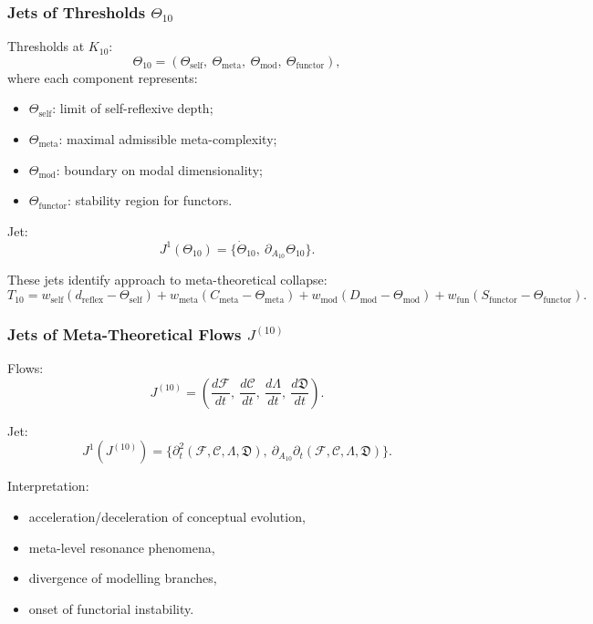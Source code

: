 \subsubsection{Jets of Thresholds $\Theta_{10}$}

Thresholds at $K_{10}$:
\[
\Theta_{10}
=
(\Theta_{\mathrm{self}},\ 
 \Theta_{\mathrm{meta}},\ 
 \Theta_{\mathrm{mod}},\ 
 \Theta_{\mathrm{functor}}),
\]
where each component represents:
\begin{itemize}
    \item $\Theta_{\mathrm{self}}$: limit of self-reflexive depth;
    \item $\Theta_{\mathrm{meta}}$: maximal admissible meta-complexity;
    \item $\Theta_{\mathrm{mod}}$: boundary on modal dimensionality;
    \item $\Theta_{\mathrm{functor}}$: stability region for functors.
\end{itemize}

Jet:
\[
J^1(\Theta_{10})
=
\{\dot{\Theta}_{10},\ \partial_{A_{10}}\Theta_{10}\}.
\]

These jets identify approach to meta-theoretical collapse:
\[
T_{10}
=
w_{\mathrm{self}}(d_{\mathrm{reflex}}-\Theta_{\mathrm{self}})
+
w_{\mathrm{meta}}(C_{\mathrm{meta}}-\Theta_{\mathrm{meta}})
+
w_{\mathrm{mod}}(D_{\mathrm{mod}}-\Theta_{\mathrm{mod}})
+
w_{\mathrm{fun}}(S_{\mathrm{functor}}-\Theta_{\mathrm{functor}}).
\]


\subsubsection{Jets of Meta-Theoretical Flows $J^{(10)}$}

Flows:
\[
J^{(10)}
=
\left(
\frac{d\mathcal{F}}{dt},\ 
\frac{d\mathcal{C}}{dt},\ 
\frac{d\Lambda}{dt},\ 
\frac{d\mathfrak{D}}{dt}
\right).
\]

Jet:
\[
J^1(J^{(10)})=
\Big\{
\partial_t^2(\mathcal{F},\mathcal{C},\Lambda,\mathfrak{D}),\
\partial_{A_{10}}\partial_t(\mathcal{F},\mathcal{C},\Lambda,\mathfrak{D})
\Big\}.
\]

Interpretation:
\begin{itemize}
    \item acceleration/deceleration of conceptual evolution,
    \item meta-level resonance phenomena,
    \item divergence of modelling branches,
    \item onset of functorial instability.
\end{itemize}


